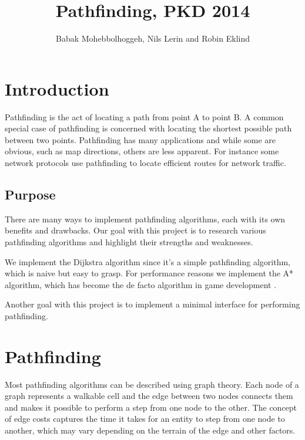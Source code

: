 \documentclass[12pt, a4paper]{article}
\title{Pathfinding, PKD 2014}
\author{Babak Mohebbolhoggeh, Nils Lerin and Robin Eklind}
\begin{document}
\maketitle

\pagebreak

\tableofcontents

\pagebreak


\section{Introduction}

Pathfinding is the act of locating a path from point A to point B. A common
special case of pathfinding is concerned with locating the shortest possible
path between two points. Pathfinding has many applications and while some are
obvious, such as map directions, others are less apparent. For instance some
network protocols use pathfinding to locate efficient routes for network
traffic.


\subsection{Purpose}

There are many ways to implement pathfinding algorithms, each with its own
benefits and drawbacks. Our goal with this project is to research various
pathfinding algorithms and highlight their strengths and weaknesses.

We implement the Dijkstra algorithm since it's a simple pathfinding algorithm,
which is naive but easy to grasp. For performance reasons we implement the A*
algorithm, which has become the de facto algorithm in game development
\cite{astar1, defacto}.

Another goal with this project is to implement a minimal interface for
performing pathfinding.


\section{Pathfinding}
\label{Pathfinding}

Most pathfinding algorithms can be described using graph theory. Each node of a
graph represents a walkable cell and the edge between two nodes connects them
and makes it possible to perform a step from one node to the other. The concept
of edge costs captures the time it takes for an entity to step from one node to
another, which may vary depending on the terrain of the edge and other factors.
\end{document}
